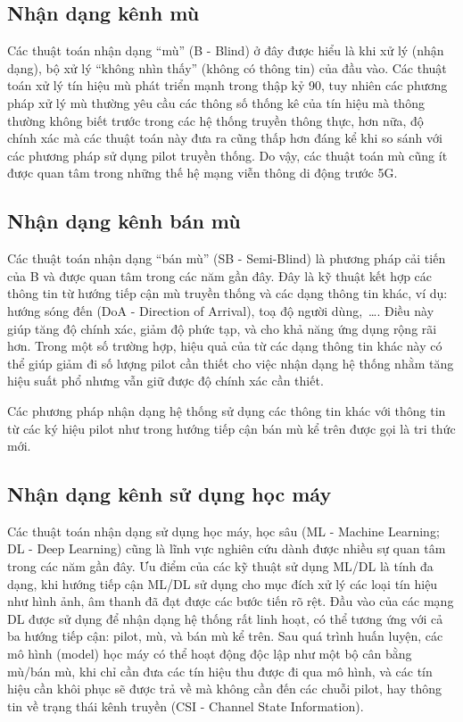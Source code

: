 \subsection{Nhận dạng kênh mù} \label{sec:blind}

Các thuật toán nhận dạng ``mù'' (B - Blind) ở đây được hiểu là khi xử lý (nhận dạng), bộ xử lý ``không nhìn thấy'' (không có thông tin) của đầu vào. Các thuật toán xử lý tín hiệu mù phát triển mạnh trong thập kỷ 90, tuy nhiên các phương pháp xử lý mù thường yêu cầu các thông số thống kê của tín hiệu mà thông thường không biết trước trong các hệ thống truyền thông thực, hơn nữa, độ chính xác mà các thuật toán này đưa ra cũng thấp hơn đáng kể khi so sánh với các phương pháp sử dụng pilot truyền thống. Do vậy, các thuật toán mù cũng ít được quan tâm trong những thế hệ mạng viễn thông di động trước 5G.

\subsection{Nhận dạng kênh bán mù} \label{sec:semi}

Các thuật toán nhận dạng ``bán mù'' (SB - Semi-Blind) là phương pháp cải tiến của B và được quan tâm trong các năm gần đây. Đây là kỹ thuật kết hợp các thông tin từ hướng tiếp cận mù truyền thống 
và các dạng thông tin khác, ví dụ: hướng sóng đến (DoA - Direction of Arrival), toạ độ người dùng,~\ldots. Điều này giúp tăng độ chính xác, giảm độ phức tạp, và cho khả năng ứng dụng rộng rãi hơn. Trong một số trường hợp, hiệu quả của từ các dạng thông tin khác này có thể giúp giảm đi số lượng pilot cần thiết cho việc nhận dạng hệ thống nhằm tăng hiệu suất phổ nhưng vẫn giữ được độ chính xác cần thiết.

Các phương pháp nhận dạng hệ thống sử dụng các thông tin khác với thông tin từ các ký hiệu pilot như trong hướng tiếp cận bán mù kể trên được gọi là tri thức mới.

\subsection{Nhận dạng kênh sử dụng học máy}

Các thuật toán nhận dạng sử dụng học máy, học sâu (ML - Machine Learning; DL - Deep Learning) cũng là lĩnh vực nghiên cứu dành được nhiều sự quan tâm trong các năm gần đây. Ưu điểm của các kỹ thuật sử dụng ML/DL là tính đa dạng, khi hướng tiếp cận ML/DL sử dụng cho mục đích xử lý các loại tín hiệu như hình ảnh, âm thanh đã đạt được các bước tiến rõ rệt. Đầu vào của các mạng DL được sử dụng để nhận dạng hệ thống rất linh hoạt, có thể tương ứng với cả ba hướng tiếp cận: pilot, mù, và bán mù kể trên. Sau quá trình huấn luyện, các mô hình (model) học máy có thể hoạt động độc lập như một bộ cân bằng mù/bán mù, khi chỉ cần đưa các tín hiệu thu được đi qua mô hình, và các tín hiệu cần khôi phục sẽ được trả về mà không cần đến các chuỗi pilot, hay thông tin về trạng thái kênh truyền (CSI - Channel State Information).
